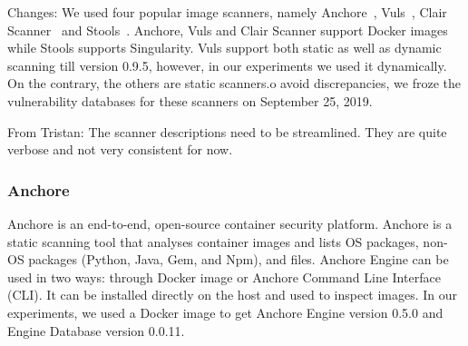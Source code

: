 \documentclass[a4paper,num-refs]{oup-contemporary}
\newcommand{\change}[2]{\color{cyan}Changes: #1\color{black}}
\newcommand{\tristan}[1]{\color{blue}From Tristan: #1\color{black}}
\begin{document}


\change{We used four popular image scanners, namely Anchore~\cite{github_2019},
Vuls~\cite{future-architect_2019}, Clair Scanner~\cite{arminc_2019} and
Stools~\cite{stools}. Anchore, Vuls and Clair Scanner support Docker
images while Stools supports Singularity. Vuls support both static as well as dynamic
scanning till version 0.9.5, however, in our experiments we used it dynamically.
On the contrary, the others
are static scanners.} To avoid discrepancies, we froze the vulnerability
databases for these scanners on September 25, 2019.


\tristan{The scanner descriptions need to be streamlined. They are quite verbose and not very consistent for now.}

\subsubsection{Anchore}

Anchore is an end-to-end, open-source container security platform. Anchore
is a static
scanning tool that analyses container images and lists OS
packages, non-OS packages (Python, Java, Gem, and Npm), and files.
Anchore Engine can be used in two ways: through Docker image or Anchore
Command Line Interface (CLI).
It can be
installed directly on the host and used to inspect images.
In our experiments, we used a Docker image to get Anchore Engine version 0.5.0 and Engine Database
version 0.0.11.
\end{document}
